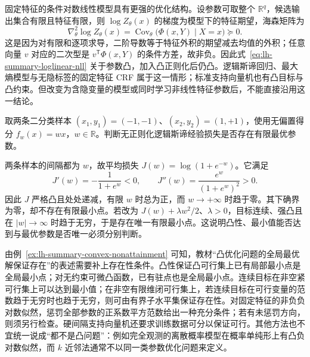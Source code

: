固定特征的条件对数线性模型具有更强的优化结构。设参数可取整个 $\mathbb R^q$，候选输出集合有限且特征有限，则 $\log Z_\theta(x)$ 的梯度为模型下的特征期望，海森矩阵为
\begin{equation}
\nabla_\theta^2\log Z_\theta(x)
=\operatorname{Cov}_\theta\bigl(\Phi(x,Y)\mid X=x\bigr)\succeq0.
\label{eq:lh-summary-logpartition-hessian}
\end{equation}
这是因为对有限和逐项求导，二阶导数等于特征外积的期望减去均值的外积；任意向量 $v$ 对应的二次型是 $v^{\mathsf T}\Phi(x,Y)$ 的条件方差，故非负。因此式~\eqref{eq:lh-summary-loglinear-nll} 关于参数凸，加入凸正则化后仍凸。逻辑斯谛回归、最大熵模型与无隐标签的固定特征 CRF 属于这一情形；标准支持向量机也有凸目标与凸约束。但改变为含隐变量的模型或同时学习非线性特征参数后，不能直接沿用这一结论。

\begin{example}
\label{ex:lh-summary-convex-nonattainment}
取两条二分类样本 $(x_1,y_1)=(-1,-1)$、$(x_2,y_2)=(1,+1)$，使用无偏置得分 $f_w(x)=wx$，$w\in\mathbb R$。判断无正则化逻辑斯谛经验损失是否存在有限最优参数。
\end{example}
\begin{solve}
两条样本的间隔都为 $w$，故平均损失 $J(w)=\log(1+e^{-w})$。它满足
\[
J'(w)=-\frac1{1+e^w}<0,\qquad
J''(w)=\frac{e^w}{(1+e^w)^2}>0.
\]
因此 $J$ 严格凸且处处递减，有限 $w$ 时总为正，而 $w\to+\infty$ 时趋于零。其下确界为零，却不存在有限最小点。若改为 $J(w)+\lambda w^2/2$、$\lambda>0$，目标连续、强凸且在 $|w|\to\infty$ 时趋于无穷，于是存在唯一有限最小点。这说明凸性、最小值能否达到与最优参数是否唯一必须分别判断。
\end{solve}

由例~\ref{ex:lh-summary-convex-nonattainment} 可知，教材“凸优化问题的全局最优解保证存在”的表述需要补上存在性条件。凸性保证凸可行集上已有局部最小点是全局最小点；对无约束可微凸函数，已有驻点也是全局最小点。连续目标在非空紧可行集上可以达到最小值；在非空有限维闭可行集上，若连续目标在可行变量的范数趋于无穷时也趋于无穷，则可由有界子水平集保证存在性。对固定特征的非负负对数似然，惩罚全部参数的正系数平方范数给出一种充分条件；若有未惩罚方向，则须另行检查。硬间隔支持向量机还要求训练数据可分以保证可行。其他方法也不宜统一说成“都不是凸问题”：例如完全观测的离散概率模型在概率单纯形上有凸负对数似然，而 $k$ 近邻法通常不以同一类参数优化问题来定义。

